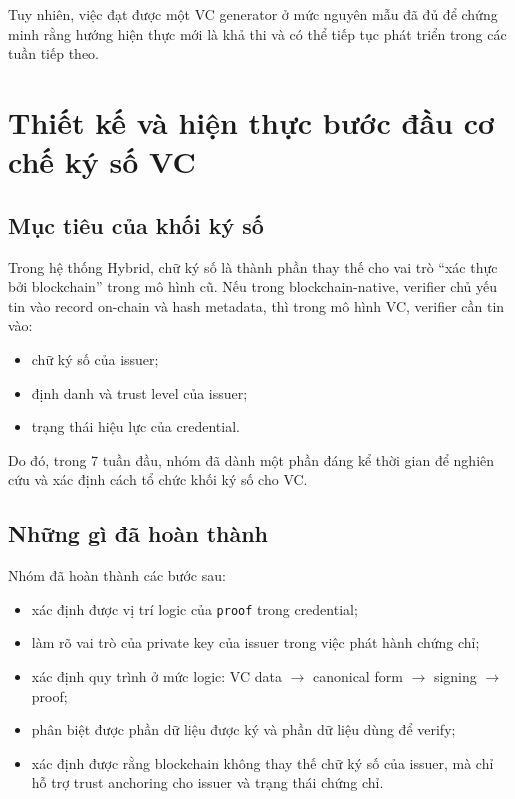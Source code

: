 Tuy nhiên, việc đạt được một VC generator ở mức nguyên mẫu đã đủ để chứng minh rằng hướng hiện thực mới là khả thi và có thể tiếp tục phát triển trong các tuần tiếp theo.

\section{Thiết kế và hiện thực bước đầu cơ chế ký số VC}

\subsection{Mục tiêu của khối ký số}

Trong hệ thống Hybrid, chữ ký số là thành phần thay thế cho vai trò ``xác thực bởi blockchain'' trong mô hình cũ. Nếu trong blockchain-native, verifier chủ yếu tin vào record on-chain và hash metadata, thì trong mô hình VC, verifier cần tin vào:
\begin{itemize}
    \item chữ ký số của issuer;
    \item định danh và trust level của issuer;
    \item trạng thái hiệu lực của credential.
\end{itemize}

Do đó, trong 7 tuần đầu, nhóm đã dành một phần đáng kể thời gian để nghiên cứu và xác định cách tổ chức khối ký số cho VC.

\subsection{Những gì đã hoàn thành}

Nhóm đã hoàn thành các bước sau:
\begin{itemize}
    \item xác định được vị trí logic của \texttt{proof} trong credential;
    \item làm rõ vai trò của private key của issuer trong việc phát hành chứng chỉ;
    \item xác định quy trình ở mức logic: VC data $\rightarrow$ canonical form $\rightarrow$ signing $\rightarrow$ proof;
    \item phân biệt được phần dữ liệu được ký và phần dữ liệu dùng để verify;
    \item xác định được rằng blockchain không thay thế chữ ký số của issuer, mà chỉ hỗ trợ trust anchoring cho issuer và trạng thái chứng chỉ.
\end{itemize}

